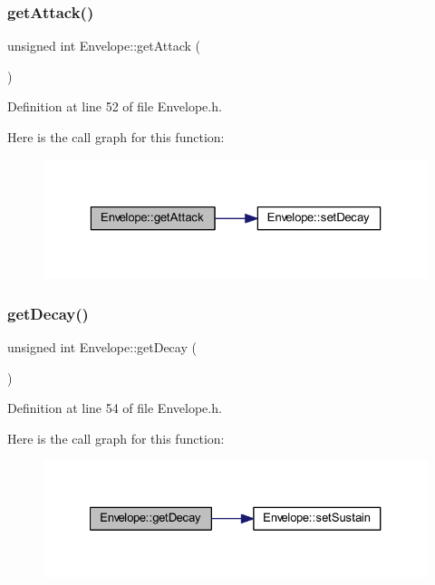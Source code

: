 \subsubsection{\texorpdfstring{get\+Attack()}{getAttack()}}
{\footnotesize\ttfamily unsigned int Envelope\+::get\+Attack (\begin{DoxyParamCaption}{ }\end{DoxyParamCaption})\hspace{0.3cm}{\ttfamily [inline]}}



Definition at line 52 of file Envelope.\+h.

Here is the call graph for this function\+:
\nopagebreak
\begin{figure}[H]
\begin{center}
\leavevmode
\includegraphics[width=323pt]{d7/df3/class_envelope_ac1cf99747551ea56b1202844da4fddde_cgraph}
\end{center}
\end{figure}
\mbox{\label{class_envelope_a6c7ba1a801512bb26e0b8114edb10544}} 
\subsubsection{\texorpdfstring{get\+Decay()}{getDecay()}}
{\footnotesize\ttfamily unsigned int Envelope\+::get\+Decay (\begin{DoxyParamCaption}{ }\end{DoxyParamCaption})\hspace{0.3cm}{\ttfamily [inline]}}



Definition at line 54 of file Envelope.\+h.

Here is the call graph for this function\+:
\nopagebreak
\begin{figure}[H]
\begin{center}
\leavevmode
\includegraphics[width=327pt]{d7/df3/class_envelope_a6c7ba1a801512bb26e0b8114edb10544_cgraph}
\end{center}
\end{figure}
\mbox{\label{class_envelope_a84eaf76b6ef7fbd2d394fba1f59cb909}} 
